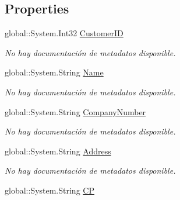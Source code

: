 \subsection*{Properties}
\begin{DoxyCompactItemize}
\item 
global\-::\-System.\-Int32 \hyperlink{class_microsoft_1_1_samples_1_1_kinect_1_1_basic_interactions_1_1_customers_aebb1f37815278ed6bc40ef6fccc30d08}{Customer\-I\-D}
\begin{DoxyCompactList}\small\item\em No hay documentación de metadatos disponible. \end{DoxyCompactList}\item 
global\-::\-System.\-String \hyperlink{class_microsoft_1_1_samples_1_1_kinect_1_1_basic_interactions_1_1_customers_ad2cd1282f1bf9bcd6dc07927a26bddeb}{Name}
\begin{DoxyCompactList}\small\item\em No hay documentación de metadatos disponible. \end{DoxyCompactList}\item 
global\-::\-System.\-String \hyperlink{class_microsoft_1_1_samples_1_1_kinect_1_1_basic_interactions_1_1_customers_a675808be08341e22652d79058fede1ef}{Company\-Number}
\begin{DoxyCompactList}\small\item\em No hay documentación de metadatos disponible. \end{DoxyCompactList}\item 
global\-::\-System.\-String \hyperlink{class_microsoft_1_1_samples_1_1_kinect_1_1_basic_interactions_1_1_customers_a949e72a6e02f34a09b323423ae70c6c0}{Address}
\begin{DoxyCompactList}\small\item\em No hay documentación de metadatos disponible. \end{DoxyCompactList}\item 
global\-::\-System.\-String \hyperlink{class_microsoft_1_1_samples_1_1_kinect_1_1_basic_interactions_1_1_customers_a9be47a5a6e639bef056fce5c542c481c}{C\-P}

\end{DoxyCompactItemize}
